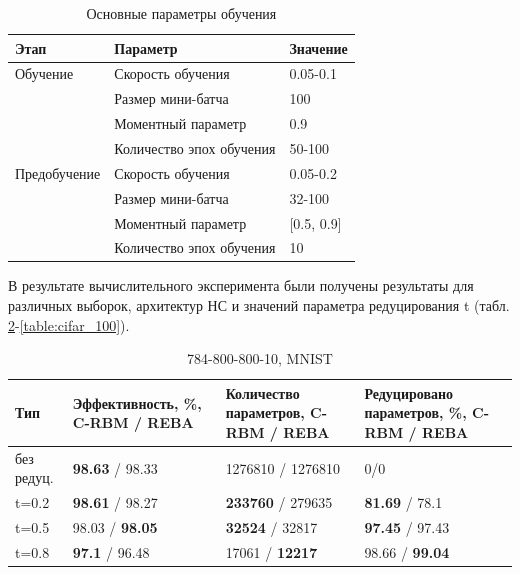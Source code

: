 \begin{table} [!h]
  \small
  \caption{Основные параметры обучения}\label{table:reduce_training_params}
\centering
\begin{tabular}{| p{3cm} | p{6cm} | p{2cm} |}
  \hline
    \textbf{Этап} & \textbf{Параметр} & \textbf{Значение}\\
    \hline
    Обучение & Скорость обучения & 0.05-0.1\\
    \cline{2-3}
    & Размер мини-батча & 100 \\
    \cline{2-3}
    & Моментный параметр & 0.9 \\
    \cline{2-3}
    & Количество эпох обучения & 50-100\\
    \hline
    Предобучение & Скорость обучения & 0.05-0.2\\
    \cline{2-3}
    & Размер мини-батча & 32-100 \\
    \cline{2-3}
    & Моментный параметр & [0.5, 0.9] \\
    \cline{2-3}
    & Количество эпох обучения & 10\\
    \hline
\end{tabular}
\end{table}

В результате вычислительного эксперимента были получены результаты для различных выборок, архитектур НС и значений параметра редуцирования t (табл. \ref{table:mnist_1}-\ref{table:cifar_100}).

\begin{table} [!h]
  \small
  \caption{784-800-800-10, MNIST}\label{table:mnist_1}
\centering
\begin{tabular}{| p{2cm} | p{4cm} | p{4cm} | p{4cm} |}
  \hline
    \textbf{Тип} & \textbf{Эффективность, \%, C-RBM / REBA} & \textbf{Количество параметров, C-RBM / REBA} & \textbf{Редуцировано параметров, \%, C-RBM / REBA}\\
    \hline
    без редуц. & \textbf{98.63} / 98.33 & 1276810 / 1276810 & 0/0\\
    \hline
    t=0.2 & \textbf{98.61} / 98.27 & \textbf{233760} / 279635 & \textbf{81.69} / 78.1\\
    \hline
    t=0.5 & 98.03 / \textbf{98.05} & \textbf{32524} / 32817 & \textbf{97.45} / 97.43\\
    \hline
    t=0.8 & \textbf{97.1} / 96.48 & 17061 / \textbf{12217} & 98.66 / \textbf{99.04}\\
    \hline
\end{tabular}
\end{table}

